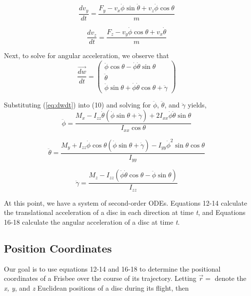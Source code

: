 \documentclass[a4paper,12pt, oneside]{article}
\newcommand{\blue}[1]{\textcolor{blue}{#1}}
\begin{document}
\begin{equation}
\frac{{dv}_y}{dt}=\frac{F_y-v_x\dot\phi\sin\dot\theta+v_z\dot\phi\cos\theta}{m}
\end{equation}

\begin{equation}
\frac{{dv}_z}{dt}=\frac{F_z-v_y\dot\phi\cos\theta+v_x\dot\theta}{m}
\end{equation}

Next, to solve for angular acceleration, we observe that 
\begin{equation}
  \label{eq:dwdt}
\frac{\vec{dw}}{dt}=\left(\begin{array}{ccc}\ddot\phi\cos\theta-\dot\phi\dot\theta\sin\theta\\ \ddot\theta \\ \ddot\phi\sin\theta + \dot\phi\dot\theta\cos\theta+\ddot\gamma\end{array} \right)
\end{equation}

Substituting (\ref{eq:dwdt}) into (10) and solving for $\ddot\phi$, $\ddot\theta$, and $\ddot\gamma$ yields,
\begin{equation}
\ddot\phi=\frac{M_x-I_{zz}\dot\theta(\dot\phi\sin\theta+\dot\gamma)+2I_{xx}\dot\phi\dot\theta\sin\theta}{I_{xx}\cos\theta}
\end{equation}

\begin{equation}
\ddot\theta=\frac{M_y+I_{zz}\dot\phi\cos\theta(\dot\phi\sin\theta+\dot\gamma)-I_{yy}\dot\phi^2\sin\theta\cos\theta} {I_{yy}}
\end{equation}

\begin{equation}
\ddot\gamma=\frac{M_z-I_{zz}(\dot\phi\dot\theta\cos\theta-\ddot\phi\sin\theta)}{I_{zz}}
\end{equation}

At this point, we have a system of second-order ODEs. Equations 12-14 calculate the translational acceleration of a disc in each direction at time \textit{t}, and Equations 16-18 calculate the angular acceleration of a disc at time \textit{t}.

\subsection{Position Coordinates}
Our goal is to use equations 12-14 and 16-18 to determine the positional coordinates of a Frisbee over the course of its trajectory. Letting $\vec{r}=$ denote the \textit{x, y}, and \textit{z} Euclidean positions of a disc during its flight, then 
\end{document}
